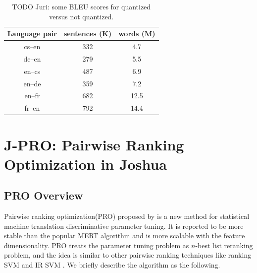 \documentclass[11pt]{article}
\begin{document}
\begin{table}
\centering
\begin{tabular}{|c|c|c|}
Language pair & sentences (K) & words (M) \\
\hline\hline
cs--en & 332 & 4.7 \\
de--en & 279 & 5.5 \\
en--cs & 487 & 6.9 \\
en--de & 359 & 7.2 \\
en--fr & 682 & 12.5 \\
fr--en & 792 & 14.4 \\
\end{tabular}
\caption{TODO Juri: some BLEU scores for quantized versus not quantized.}
\end{table}


\section{J-PRO: Pairwise Ranking Optimization in Joshua}
\label{section:results}
\subsection{PRO Overview} \label{section:pro-overview}
Pairwise ranking optimization(PRO) proposed by \cite{Hopkins2011} is a new method for statistical machine translation discriminative parameter tuning. It is reported to be more stable than the popular MERT algorithm\cite{Och2003} and is more scalable with the feature dimensionality. PRO treats the parameter tuning problem as $n$-best list reranking problem, and the idea is similar to other pairwise ranking techniques like ranking SVM and IR SVM \cite{Hang2011}. We briefly describe the algorithm as the following.
\end{document}
